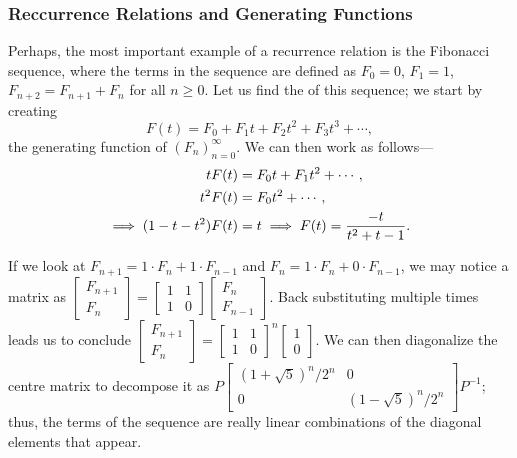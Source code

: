 \subsubsection{Reccurrence Relations and Generating Functions}
Perhaps, the most important example of a recurrence relation is the Fibonacci sequence, where the terms in the sequence are defined as $F_{0} = 0$, $F_{1} = 1$, $F_{n+2} = F_{n+1} + F_{n}$ for all $n \geq 0$. Let us find the  of this sequence; we start by creating
\begin{equation}
    F(t) = F_{0} + F_{1}t + F_{2}t^{2} + F_{3}t^{3} + \cdots,
\end{equation}
the generating function of $(F_{n})_{n=0}^{\infty}$. We can then work as follows---
\begin{align}
    tF(t) &= F_{0}t + F_{1}t^{2} + \cdots,\notag\\
    t^{2}F(t) &= F_{0}t^{2} + \cdots,\notag\\
    \implies (1-t-t^{2})F(t) &= t \implies F(t) = \frac{-t}{t^{2}+t-1}.
\end{align}

If we look at $F_{n+1} = 1 \cdot F_{n} + 1 \cdot F_{n-1}$ and $F_{n} = 1 \cdot F_{n} + 0 \cdot F_{n-1}$, we may notice a matrix as $\begin{bmatrix}
    F_{n+1} \\ F_{n}
\end{bmatrix} = \begin{bmatrix}
    1 & 1 \\ 1 & 0
\end{bmatrix} \begin{bmatrix}
    F_{n} \\ F_{n-1}
\end{bmatrix}$. Back substituting multiple times leads us to conclude $\begin{bmatrix}
    F_{n+1} \\ F_{n}
\end{bmatrix} = \begin{bmatrix}
    1 & 1 \\ 1 & 0
\end{bmatrix}^{n} \begin{bmatrix}
    1 \\ 0
\end{bmatrix}$. We can then diagonalize the centre matrix to decompose it as $P \begin{bmatrix}
    (1+\sqrt{5})^{n}/2^{n} & 0 \\ 0 & (1-\sqrt{5})^{n}/2^{n}
\end{bmatrix} P^{-1}$; thus, the terms of the sequence are really linear combinations of the diagonal elements that appear.

